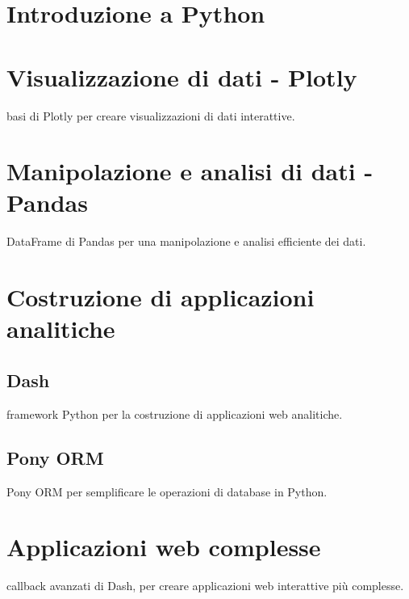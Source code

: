 \section{Introduzione a Python}

%

\section{Visualizzazione di dati - Plotly}
basi di Plotly per creare visualizzazioni di dati interattive. 

%

\section{Manipolazione e analisi di dati - Pandas}
DataFrame di Pandas per una manipolazione e analisi efficiente dei dati.

%

\section{Costruzione di applicazioni analitiche}
\subsection{Dash}
framework Python per la costruzione di applicazioni web
analitiche.

\subsection{Pony ORM}
Pony ORM per semplificare le operazioni di database in Python. 

%

\section{Applicazioni web complesse}
callback avanzati di Dash, per creare applicazioni web interattive più complesse.